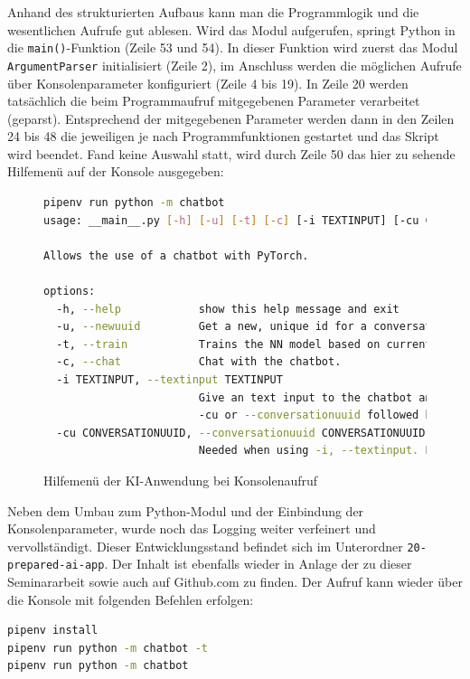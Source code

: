 \documentclass[12pt,oneside,titlepage,listof=totoc,bibliography=totoc]{scrartcl}
\newcommand{\code}[1]{\colorbox{code-gray}{\texttt{#1}}}
\begin{document}
Anhand des strukturierten Aufbaus kann man die Programmlogik und die wesentlichen Aufrufe gut ablesen. Wird das Modul aufgerufen, springt Python in die \code{main()}-Funktion (Zeile 53 und 54). In dieser Funktion wird zuerst das Modul \code{ArgumentParser} initialisiert (Zeile 2), im Anschluss werden die möglichen Aufrufe über Konsolenparameter konfiguriert (Zeile 4 bis 19). In Zeile 20 werden tatsächlich die beim Programmaufruf mitgegebenen Parameter verarbeitet (geparst). Entsprechend der mitgegebenen Parameter werden dann in den Zeilen 24 bis 48 die jeweiligen je nach Programmfunktionen gestartet und das Skript wird beendet. Fand keine Auswahl statt, wird durch Zeile 50 das hier zu sehende Hilfemenü auf der Konsole ausgegeben:

\begin{figure}[H]
	\caption{Hilfemenü der KI-Anwendung bei Konsolenaufruf}
	\label{fig:code-help-para}
\begin{lstlisting}[language=bash]
pipenv run python -m chatbot       
usage: __main__.py [-h] [-u] [-t] [-c] [-i TEXTINPUT] [-cu CONVERSATIONUUID]

Allows the use of a chatbot with PyTorch.

options:
  -h, --help            show this help message and exit
  -u, --newuuid         Get a new, unique id for a conversation.
  -t, --train           Trains the NN model based on current data.
  -c, --chat            Chat with the chatbot.
  -i TEXTINPUT, --textinput TEXTINPUT
                        Give an text input to the chatbot and recive a answer. Provide a UUID for the conversation with  
                        -cu or --conversationuuid followed by the UUID.
  -cu CONVERSATIONUUID, --conversationuuid CONVERSATIONUUID
                        Needed when using -i, --textinput. Provide a UUID to a conversation.
\end{lstlisting} \end{figure}

Neben dem Umbau zum Python-Modul und der Einbindung der Konsolenparameter, wurde noch das Logging weiter verfeinert und vervollständigt. Dieser Entwicklungsstand befindet sich im Unterordner \code{20-prepared-ai-app}. Der Inhalt ist ebenfalls wieder in Anlage der zu dieser Seminararbeit sowie auch auf Github.com zu finden. Der Aufruf kann wieder über die Konsole mit folgenden Befehlen erfolgen: 

\begin{lstlisting}[language=bash]
pipenv install
pipenv run python -m chatbot -t
pipenv run python -m chatbot
\end{lstlisting}
\end{document}
